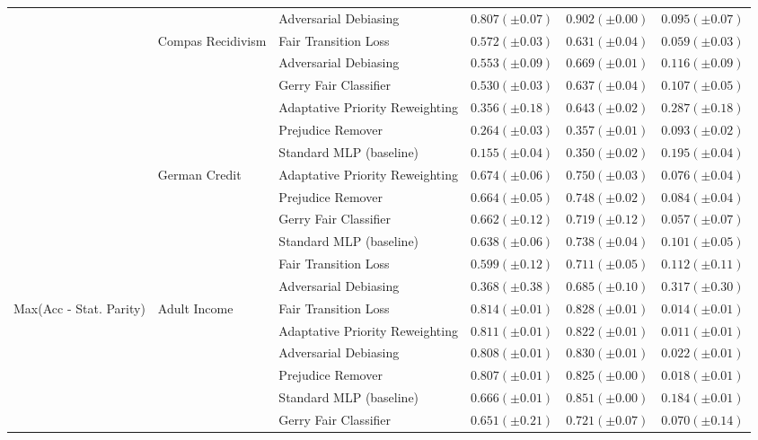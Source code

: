 \begin{tabular}{llllll}
 &  & Adversarial Debiasing & $0.807 (\pm0.07)$ & $0.902 (\pm0.00)$ & $0.095 (\pm0.07)$ \\
\cline{2-6}
 & \multirow[t]{6}{*}{Compas Recidivism} & Fair Transition Loss & $0.572 (\pm0.03)$ & $0.631 (\pm0.04)$ & $0.059 (\pm0.03)$ \\
 &  & Adversarial Debiasing & $0.553 (\pm0.09)$ & $0.669 (\pm0.01)$ & $0.116 (\pm0.09)$ \\
 &  & Gerry Fair Classifier & $0.530 (\pm0.03)$ & $0.637 (\pm0.04)$ & $0.107 (\pm0.05)$ \\
 &  & Adaptative Priority Reweighting & $0.356 (\pm0.18)$ & $0.643 (\pm0.02)$ & $0.287 (\pm0.18)$ \\
 &  & Prejudice Remover & $0.264 (\pm0.03)$ & $0.357 (\pm0.01)$ & $0.093 (\pm0.02)$ \\
 &  & Standard MLP (baseline) & $0.155 (\pm0.04)$ & $0.350 (\pm0.02)$ & $0.195 (\pm0.04)$ \\
\cline{2-6}
 & \multirow[t]{6}{*}{German Credit} & Adaptative Priority Reweighting & $0.674 (\pm0.06)$ & $0.750 (\pm0.03)$ & $0.076 (\pm0.04)$ \\
 &  & Prejudice Remover & $0.664 (\pm0.05)$ & $0.748 (\pm0.02)$ & $0.084 (\pm0.04)$ \\
 &  & Gerry Fair Classifier & $0.662 (\pm0.12)$ & $0.719 (\pm0.12)$ & $0.057 (\pm0.07)$ \\
 &  & Standard MLP (baseline) & $0.638 (\pm0.06)$ & $0.738 (\pm0.04)$ & $0.101 (\pm0.05)$ \\
 &  & Fair Transition Loss & $0.599 (\pm0.12)$ & $0.711 (\pm0.05)$ & $0.112 (\pm0.11)$ \\
 &  & Adversarial Debiasing & $0.368 (\pm0.38)$ & $0.685 (\pm0.10)$ & $0.317 (\pm0.30)$ \\
\cline{1-6} \cline{2-6}
\multirow[t]{24}{*}{Max(Acc - Stat. Parity)} & \multirow[t]{6}{*}{Adult Income} & Fair Transition Loss & $0.814 (\pm0.01)$ & $0.828 (\pm0.01)$ & $0.014 (\pm0.01)$ \\
 &  & Adaptative Priority Reweighting & $0.811 (\pm0.01)$ & $0.822 (\pm0.01)$ & $0.011 (\pm0.01)$ \\
 &  & Adversarial Debiasing & $0.808 (\pm0.01)$ & $0.830 (\pm0.01)$ & $0.022 (\pm0.01)$ \\
 &  & Prejudice Remover & $0.807 (\pm0.01)$ & $0.825 (\pm0.00)$ & $0.018 (\pm0.01)$ \\
 &  & Standard MLP (baseline) & $0.666 (\pm0.01)$ & $0.851 (\pm0.00)$ & $0.184 (\pm0.01)$ \\
 &  & Gerry Fair Classifier & $0.651 (\pm0.21)$ & $0.721 (\pm0.07)$ & $0.070 (\pm0.14)$ \\

\end{tabular}
